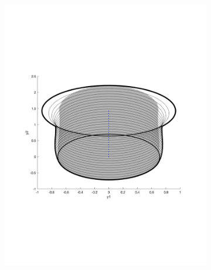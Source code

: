 \begin{figure}
\begin{subfigure}[b]{0.3\textwidth}
    \includegraphics[width=\textwidth]{figures/experiments/FunnelSim1}
  \end{subfigure}
  \begin{subfigure}[b]{0.3\textwidth}

\end{subfigure}
\end{figure}
